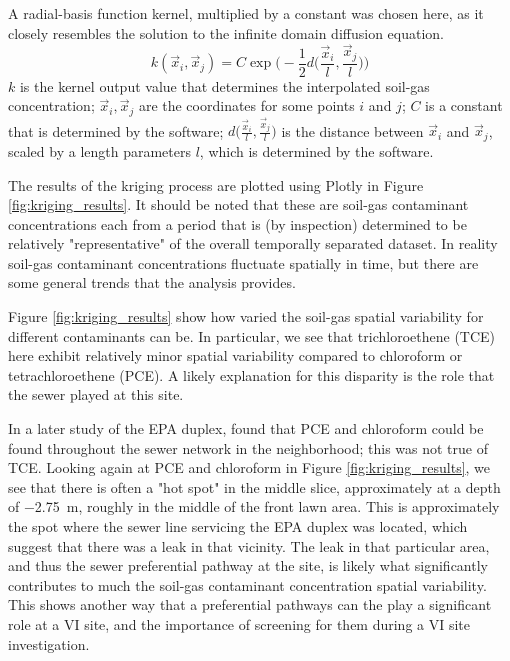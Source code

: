 A radial-basis function kernel, multiplied by a constant was chosen here, as it closely resembles the solution to the infinite domain diffusion equation.
\begin{equation}
  k(\vec{x}_i, \vec{x}_j) = C \exp{\Big( -\frac{1}{2} d\Big( \frac{\vec{x}_i}{l}, \frac{\vec{x}_j}{l} \Big) \Big)}
\end{equation}
$k$ is the kernel output value that determines the interpolated soil-gas concentration;
$\vec{x}_i, \vec{x}_j$ are the coordinates for some points $i$ and $j$;
$C$ is a constant that is determined by the software;
$d\Big( \frac{\vec{x}_i}{l}, \frac{\vec{x}_j}{l} \Big)$ is the distance between $\vec{x}_i$ and $\vec{x}_j$, scaled by a length parameters $l$, which is determined by the software.\par

The results of the kriging process are plotted using Plotly\cite{plotly_technologies_inc._collaborative_nodate} in Figure \ref{fig:kriging_results}.
It should be noted that these are soil-gas contaminant concentrations each from a period that is (by inspection) determined to be relatively "representative" of the overall temporally separated dataset.
In reality soil-gas contaminant concentrations fluctuate spatially in time, but there are some general trends that the analysis provides.\par

Figure \ref{fig:kriging_results} show how varied the soil-gas spatial variability for different contaminants can be.
In particular, we see that trichloroethene (TCE) here exhibit relatively minor spatial variability compared to chloroform or tetrachloroethene (PCE).
A likely explanation for this disparity is the role that the sewer played at this site.\par

In a later study of the EPA duplex, \citeauthor{mchugh_evidence_2017}\cite{mchugh_evidence_2017} found that PCE and chloroform could be found throughout the sewer network in the neighborhood; this was not true of TCE.
Looking again at PCE and chloroform in Figure \ref{fig:kriging_results}, we see that there is often a "hot spot" in the middle slice, approximately at a depth of \SI{-2.75}{\metre}, roughly in the middle of the front lawn area.
This is approximately the spot where the sewer line servicing the EPA duplex was located, which suggest that there was a leak in that vicinity.
The leak in that particular area, and thus the sewer preferential pathway at the site, is likely what significantly contributes to much the soil-gas contaminant concentration spatial variability.
This shows another way that a preferential pathways can the play a significant role at a VI site, and the importance of screening for them during a VI site investigation.\par

